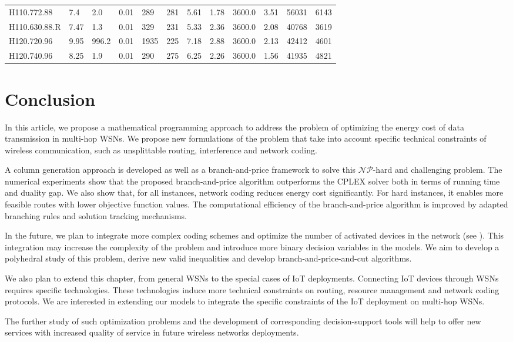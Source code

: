 \begin{table}
{\begin{tabular}{*{1}{l}|*{5}{l}|*{6}{l}|}
        \midrule
        H110.772.88   &7.4&2.0&0.01&289&281&5.61&1.78&3600.0&3.51&56031&6143   \\
        H110.630.88.R  &7.47&1.3&0.01&329&231&5.33&2.36&3600.0&2.08&40768&3619 \\
        \midrule
        H120.720.96  &9.95&996.2&0.01&1935&225&7.18&2.88&3600.0&2.13&42412&4601 \\
        H120.740.96  &8.25&1.9&0.01&290&275&6.25&2.26&3600.0&1.56&41935&4821  \\
    \bottomrule
    \end{tabular}}%
  \label{nch}%
\end{table}

\section{Conclusion}
\label{sec6}
In this article, we propose a mathematical programming approach to address the problem of optimizing the energy cost of data transmission in multi-hop WSNs.
We propose new formulations of the problem that take into account specific technical constraints of wireless communication, such as unsplittable routing, interference and network coding.

A column generation approach is developed as well as a branch-and-price framework to solve this $\mathcal{NP}$-hard and challenging problem.
 The numerical experiments show that the proposed branch-and-price algorithm outperforms the CPLEX solver both in terms of running time and duality gap.
 We also show that, for all instances, network coding reduces energy cost significantly. For hard instances, it enables more feasible routes with lower objective function values.
The computational efficiency of the branch-and-price algorithm is improved by adapted branching rules and solution tracking mechanisms.

 In the future, we plan to integrate more complex coding schemes and optimize the number of activated devices in the network (see \cite{vanier2018column}). This integration may increase the complexity of the problem and introduce more binary decision variables in the models. We aim to develop a polyhedral study of this problem, derive new valid inequalities and develop branch-and-price-and-cut algorithms.
 
 We also plan to extend this chapter, from general WSNs to the special cases of IoT deployments.
 Connecting IoT devices through WSNs requires specific technologies. These technologies induce more technical constraints on routing, resource management and network coding protocols. We are interested in extending our models to integrate the specific constraints of the IoT deployment on multi-hop WSNs.
 
  The further study of such optimization problems and the development of corresponding decision-support tools will help to offer new services with increased quality of service in future wireless networks deployments.

